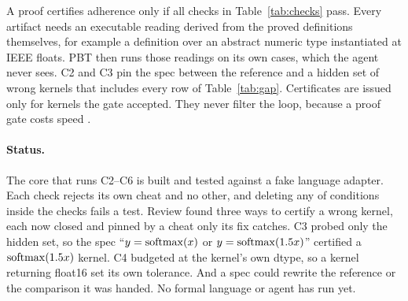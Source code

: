 A proof certifies adherence only if all \formalChecks{} checks in Table~\ref{tab:checks}
pass. Every artifact needs an executable reading derived from the proved definitions
themselves, for example a definition over an abstract numeric type instantiated at IEEE
floats. PBT then runs those readings on its own cases, which the agent never sees. C2 and
C3 pin the spec between the reference and a hidden set of wrong kernels that includes
every row of Table~\ref{tab:gap}. Certificates are issued only for kernels the gate
accepted. They never filter the loop, because a proof gate costs speed
\citep{costa2026aicompiler}.

\paragraph{Status.} The core that runs C2--C6 is built and tested against a fake
language adapter. Each check rejects its own cheat and no other, and deleting any of
\formalRemovedConditions{} conditions inside the checks fails a test. Review found three ways to
certify a wrong kernel, each now closed and pinned by a cheat only its fix catches. C3 probed
only the hidden set, so the spec ``$y = \operatorname{softmax}(x)$ or $y = \operatorname{softmax}(1.5x)$'' certified a
$\operatorname{softmax}(1.5x)$ kernel. C4 budgeted at the kernel's own dtype, so a kernel returning
float16 set its own tolerance. And a spec could rewrite the reference or the comparison it
was handed. No formal language or agent has run yet.
